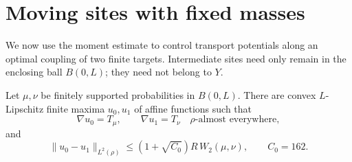 \section{Moving sites with fixed masses}
\label{sec:finite-stability}

We now use the moment estimate to control transport potentials along an
optimal coupling of two finite targets. Intermediate sites need only
remain in the enclosing ball \(B(0,L)\); they need not belong to \(Y\).

\begin{proposition}\label{finite:potentials}
Let \(\mu,\nu\) be finitely supported probabilities in \(B(0,L)\).
There are convex \(L\)-Lipschitz finite maxima \(u_0,u_1\) of affine
functions such that
\[
 \nabla u_0=T_\mu,\qquad \nabla u_1=T_\nu
 \quad \rho\text{-almost everywhere},
\]
and
\begin{equation}
 \|u_0-u_1\|_{L^2(\rho)}
 \le (1+\sqrt{C_0})R\,W_2(\mu,\nu),
 \qquad C_0=162.
 \label{eq:finite-potential-bound}
\end{equation}
\end{proposition}

